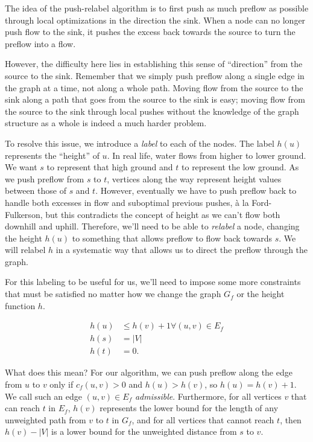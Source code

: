 The idea of the push-relabel algorithm is to first push as much preflow as possible through local optimizations in the direction the sink. When a node can no longer push flow to the sink, it pushes the excess back towards the source to turn the preflow into a flow.

However, the difficulty here lies in establishing this sense of ``direction'' from the source to the sink. Remember that we simply push preflow along a single edge in the graph at a time, not along a whole path. Moving flow from the source to the sink along a path that goes from the source to the sink is easy; moving flow from the source to the sink through local pushes without the knowledge of the graph structure as a whole is indeed a much harder problem.

To resolve this issue, we introduce a \textit{label} to each of the nodes. The label $h(u)$ represents the ``height'' of $u$. In real life, water flows from higher to lower ground. We want $s$ to represent that high ground and $t$ to represent the low ground. As we push preflow from $s$ to $t$, vertices along the way represent height values between those of $s$ and $t$. However, eventually we have to push preflow back to handle both excesses in flow and suboptimal previous pushes, \`{a} la Ford-Fulkerson, but this contradicts the concept of height as we can't flow both downhill and uphill. Therefore, we'll need to be able to \textit{relabel} a node, changing the height $h(u)$ to something that allows preflow to flow back towards $s$. We will relabel $h$ in a systematic way that allows us to direct the preflow through the graph.

For this labeling to be useful for us, we'll need to impose some more constraints that must be satisfied no matter how we change the graph $G_f$ or the height function $h$.

\begin{align*}
h(u) &\le h(v) + 1 \forall (u,v) \in E_f \\
h(s) &= |V| \\
h(t) &= 0.
\end{align*}

What does this mean? For our algorithm, we can push preflow along the edge from $u$ to $v$ only if $c_f(u,v) > 0$ and $h(u) > h(v)$, so $h(u) = h(v) + 1$. We call such an edge $(u,v) \in E_f$ \textit{admissible}. Furthermore, for all vertices $v$ that can reach $t$ in $E_f$, $h(v)$ represents the lower bound for the length of any unweighted path from $v$ to $t$ in $G_f$, and for all vertices that cannot reach $t$, then $h(v)-|V|$ is a lower bound for the unweighted distance from $s$ to $v$.

